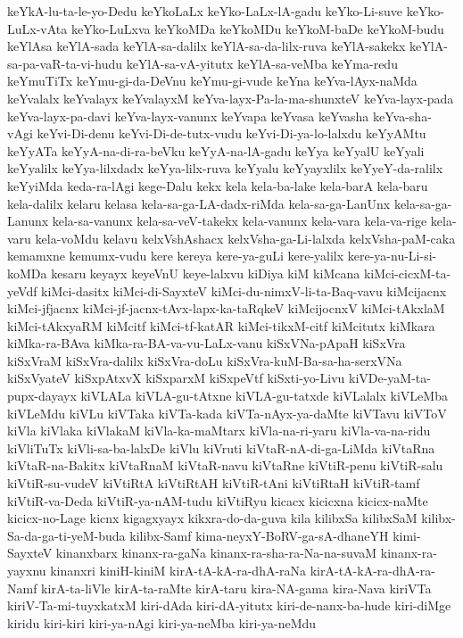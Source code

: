 {keYkA-lu-ta-le-yo-Dedu
keYkoLaLx
keYko-LaLx-lA-gadu
keYko-Li-suve
keYko-LuLx-vAta
keYko-LuLxva
keYkoMDa
keYkoMDu
keYkoM-baDe
keYkoM-budu
keYlAsa
keYlA-sada
keYlA-sa-dalilx
keYlA-sa-da-lilx-ruva
keYlA-sakekx
keYlA-sa-pa-vaR-ta-vi-hudu
keYlA-sa-vA-yitutx
keYlA-sa-veMba
keYma-redu
keYmuTiTx
keYmu-gi-da-DeVnu
keYmu-gi-vude
keYna
keYva-lAyx-naMda
keYvalalx
keYvalayx
keYvalayxM
keYva-layx-Pa-la-ma-shunxteV
keYva-layx-pada
keYva-layx-pa-davi
keYva-layx-vanunx
keYvapa
keYvasa
keYvasha
keYva-sha-vAgi
keYvi-Di-denu
keYvi-Di-de-tutx-vudu
keYvi-Di-ya-lo-lalxdu
keYyAMtu
keYyATa
keYyA-na-di-ra-beVku
keYyA-na-lA-gadu
keYya
keYyalU
keYyali
keYyalilx
keYya-lilxdadx
keYya-lilx-ruva
keYyalu
keYyayxlilx
keYyeY-da-ralilx
keYyiMda
keda-ra-lAgi
kege-Dalu
kekx
kela
kela-ba-lake
kela-barA
kela-baru
kela-dalilx
kelaru
kelasa
kela-sa-ga-LA-dadx-riMda
kela-sa-ga-LanUnx
kela-sa-ga-Lanunx
kela-sa-vanunx
kela-sa-veV-takekx
kela-vanunx
kela-vara
kela-va-rige
kela-varu
kela-voMdu
kelavu
kelxVshAshacx
kelxVsha-ga-Li-lalxda
kelxVsha-paM-caka
kemamxne
kemumx-vudu
kere
kereya
kere-ya-guLi
kere-yalilx
kere-ya-nu-Li-si-koMDa
kesaru
keyayx
keyeVnU
keye-lalxvu
kiDiya
kiM
kiMcana
kiMci-cicxM-ta-yeVdf
kiMci-dasitx
kiMci-di-SayxteV
kiMci-du-nimxV-li-ta-Baq-vavu
kiMcijacnx
kiMci-jfjacnx
kiMci-jf-jacnx-tAvx-lapx-ka-taRqkeV
kiMcijocnxV
kiMci-tAkxlaM
kiMci-tAkxyaRM
kiMcitf
kiMci-tf-katAR
kiMci-tikxM-citf
kiMcitutx
kiMkara
kiMka-ra-BAva
kiMka-ra-BA-va-vu-LaLx-vanu
kiSxVNa-pApaH
kiSxVra
kiSxVraM
kiSxVra-dalilx
kiSxVra-doLu
kiSxVra-kuM-Ba-sa-ha-serxVNa
kiSxVyateV
kiSxpAtxvX
kiSxparxM
kiSxpeVtf
kiSxti-yo-Livu
kiVDe-yaM-ta-pupx-dayayx
kiVLALa
kiVLA-gu-tAtxne
kiVLA-gu-tatxde
kiVLalalx
kiVLeMba
kiVLeMdu
kiVLu
kiVTaka
kiVTa-kada
kiVTa-nAyx-ya-daMte
kiVTavu
kiVToV
kiVla
kiVlaka
kiVlakaM
kiVla-ka-maMtarx
kiVla-na-ri-yaru
kiVla-va-na-ridu
kiVliTuTx
kiVli-sa-ba-lalxDe
kiVlu
kiVruti
kiVtaR-nA-di-ga-LiMda
kiVtaRna
kiVtaR-na-Bakitx
kiVtaRnaM
kiVtaR-navu
kiVtaRne
kiVtiR-penu
kiVtiR-salu
kiVtiR-su-vudeV
kiVtiRtA
kiVtiRtAH
kiVtiR-tAni
kiVtiRtaH
kiVtiR-tamf
kiVtiR-va-Deda
kiVtiR-ya-nAM-tudu
kiVtiRyu
kicacx
kicicxna
kicicx-naMte
kicicx-no-Lage
kicnx
kigagxyayx
kikxra-do-da-guva
kila
kilibxSa
kilibxSaM
kilibx-Sa-da-ga-ti-yeM-buda
kilibx-Samf
kima-neyxY-BoRV-ga-sA-dhaneYH
kimi-SayxteV
kinanxbarx
kinanx-ra-gaNa
kinanx-ra-sha-ra-Na-na-suvaM
kinanx-ra-yayxnu
kinanxri
kiniH-kiniM
kirA-tA-kA-ra-dhA-raNa
kirA-tA-kA-ra-dhA-ra-Namf
kirA-ta-liVle
kirA-ta-raMte
kirA-taru
kira-NA-gama
kira-Nava
kiriVTa
kiriV-Ta-mi-tuyxkatxM
kiri-dAda
kiri-dA-yitutx
kiri-de-nanx-ba-hude
kiri-diMge
kiridu
kiri-kiri
kiri-ya-nAgi
kiri-ya-neMba
kiri-ya-neMdu
}
